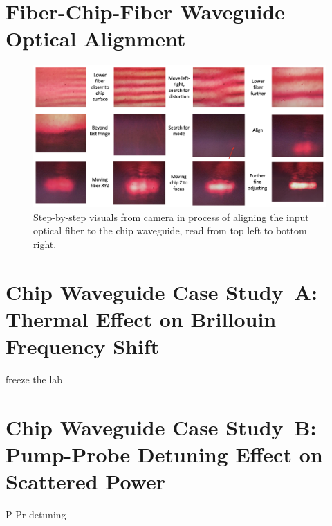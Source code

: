 \section{Fiber-Chip-Fiber Waveguide Optical Alignment}
\label{Raman:Appendix:sec:WaveguideAlignment}

\begin{figure}[t]
  \centering
  \includegraphics[width=\textwidth]{figs/4-Raman/WaveguideAlignmentCameraFringePattern.png}
  \caption{Step-by-step visuals from camera in process of aligning the input optical fiber to the chip waveguide, read from top left to bottom right.}
  \label{fig:Raman:WaveguideAlignmentCameraFringePattern}
\end{figure}

\section{Chip Waveguide Case Study~A: Thermal Effect on Brillouin Frequency Shift}
\label{Raman:Appendix:sec:CaseStudyAThermal}

freeze the lab

\section{Chip Waveguide Case Study~B: Pump-Probe Detuning Effect on Scattered Power}
\label{Raman:Appendix:sec:CaseStudyBDetuning}

P-Pr detuning
